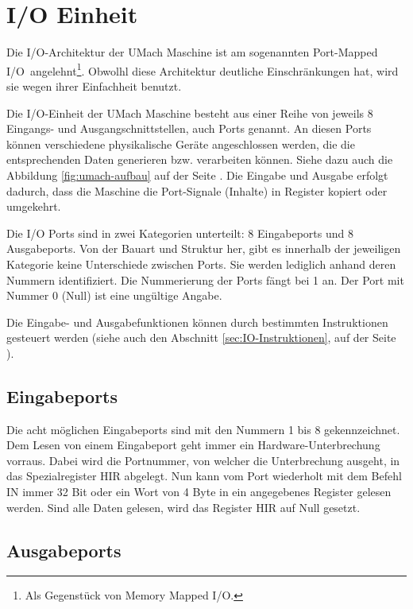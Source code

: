 \section{I/O Einheit}
\label{sec:IO-Einheit}

Die I/O-Architektur der UMach Maschine ist am sogenannten \glqq Port-Mapped
I/O\grqq\ angelehnt\footnote{Als Gegenstück von \glqq Memory Mapped I/O\grqq.}.
Obwolhl diese Architektur deutliche Einschränkungen hat, wird sie wegen ihrer
Einfachheit benutzt.


Die I/O-Einheit der UMach Maschine besteht aus einer Reihe von jeweils 8
Eingangs- und Ausgangschnittstellen, auch Ports
genannt. An diesen Ports können verschiedene physikalische Geräte angeschlossen
werden, die die entsprechenden Daten generieren bzw. verarbeiten können. Siehe
dazu auch die Abbildung \ref{fig:umach-aufbau} auf der Seite
\pageref{fig:umach-aufbau}. Die Eingabe und Ausgabe erfolgt dadurch, dass die
Maschine die Port-Signale (Inhalte) in Register kopiert oder umgekehrt.


Die I/O Ports sind in zwei Kategorien unterteilt: 8 Eingabeports und 8
Ausgabeports. Von der Bauart und Struktur her, gibt es innerhalb der jeweiligen
Kategorie keine Unterschiede zwischen Ports. Sie werden lediglich anhand deren
Nummern identifiziert. Die Nummerierung der Ports fängt bei 1 an. Der Port mit
Nummer 0 (Null) ist eine ungültige Angabe.


Die Eingabe- und Ausgabefunktionen können durch bestimmten Instruktionen
gesteuert werden (siehe auch den Abschnitt \ref{sec:IO-Instruktionen}, auf der
Seite \pageref{sec:IO-Instruktionen}).



\subsection{Eingabeports}

Die acht möglichen Eingabeports sind mit den Nummern 1 bis 8 gekennzeichnet. Dem
Lesen von einem Eingabeport geht immer ein Hardware-Unterbrechung vorraus. Dabei
wird die Portnummer, von welcher die Unterbrechung ausgeht, in das
Spezialregister HIR abgelegt. Nun kann vom Port wiederholt mit dem Befehl IN
immer 32 Bit oder ein Wort von 4 Byte in ein angegebenes Register gelesen
werden. Sind alle Daten gelesen, wird das Register HIR auf Null gesetzt.

\subsection{Ausgabeports}
\label{subsec:Ausgabeports}

